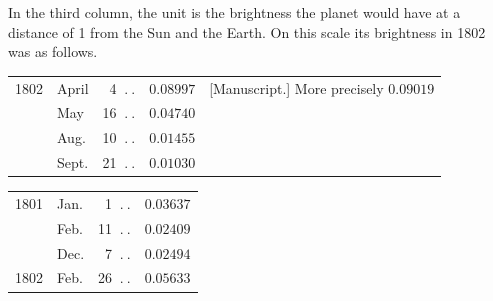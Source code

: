 In the third column, the unit is the brightness the planet would have at a distance of 1 from the Sun and the Earth. On this scale its brightness in 1802 was as follows.
\begin{center}
\begingroup\small
\begin{tabular}{llr r l}
1802&April&4 $\ .\ .$&$0.08997$&[Manuscript.] More precisely $0.09019$\\
&May&16 $\ .\ .$&$0.04740$&\\
&Aug.&10 $\ .\ .$&$0.01455$&\\
&Sept.&21 $\ .\ .$&$0.01030$&
\end{tabular}\par\medskip
\begin{tabular}{llr r}
1801&Jan.&1 $\ .\ .$&$0.03637$\\
&Feb.&11 $\ .\ .$&$0.02409$\\
&Dec.&7 $\ .\ .$&$0.02494$\\
1802&Feb.&26 $\ .\ .$&$0.05633$
\end{tabular}\endgroup
\end{center}
\begin{flushright}\end{flushright}


